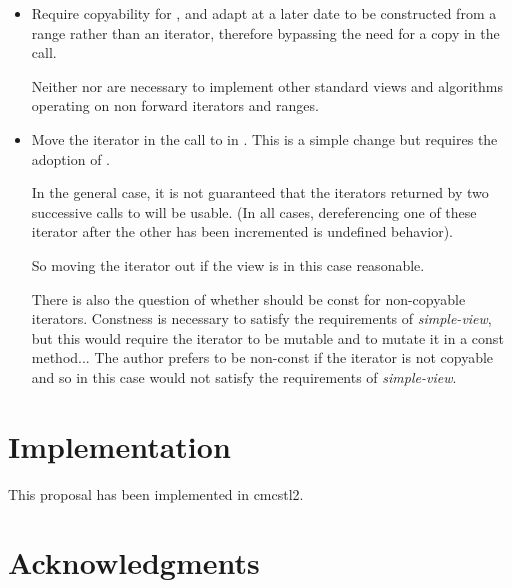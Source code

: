 \documentclass{wg21}
\begin{document}
\begin{itemize}
\item Require copyability for , and adapt  at a later date to be constructed from a range rather than an iterator, therefore bypassing the need for a copy in the  call.

\begin{note}
Neither  nor  are necessary to implement other standard views and algorithms operating on non forward iterators and ranges.
\end{note}

\item Move the iterator in the call to  in .
This is a simple change but requires the adoption of \cite{P1456}.


\begin{note}
	In the general case, it is not guaranteed that the iterators returned by two successive calls to  will be usable.
	(In all cases, dereferencing one of these iterator after the other has been incremented is undefined behavior).

	So moving the iterator out if the view is in this case reasonable.
\end{note}

There is also the question of whether  should be const for non-copyable iterators.
Constness is necessary to satisfy the requirements of \emph{simple-view}, but this would require the iterator to be mutable and to mutate it in a const method...
The author prefers  to be non-const if the iterator is not copyable and so in this case
 would not satisfy the requirements of \emph{simple-view}.



\end{itemize}

\section{Implementation}

This proposal has been implemented in cmcstl2.

\section{Acknowledgments}
\end{document}
